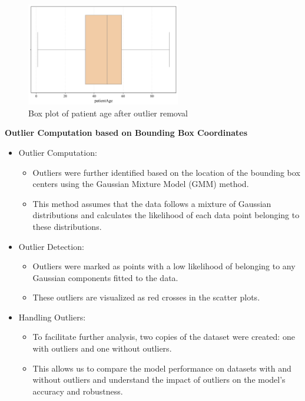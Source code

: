 \begin{figure}[H]
    \begin{center}
        \includegraphics[width = 0.6\textwidth]{figures/Figure3.png}
        \caption{Box plot of patient age after outlier removal}
        \label{fig:cha-2 figure16}
    \end{center}
\end{figure}

\newpage
\textbf{Outlier Computation based on Bounding Box Coordinates}
\begin{itemize}
    \item Outlier Computation:
          \begin{itemize}
              \item Outliers were further identified based on the location of the bounding box centers using the Gaussian Mixture Model (GMM) method.
              \item This method assumes that the data follows a mixture of Gaussian distributions and calculates the likelihood of each data point belonging to these distributions.
          \end{itemize}
    \item Outlier Detection:
          \begin{itemize}
              \item Outliers were marked as points with a low likelihood of belonging to any Gaussian components fitted to the data.
              \item These outliers are visualized as red crosses in the scatter plots.
          \end{itemize}
    \item Handling Outliers:
          \begin{itemize}
              \item To facilitate further analysis, two copies of the dataset were created: one with outliers and one without outliers.
              \item This allows us to compare the model performance on datasets with and without outliers and understand the impact of outliers on the model's accuracy and robustness.
          \end{itemize}
\end{itemize}

